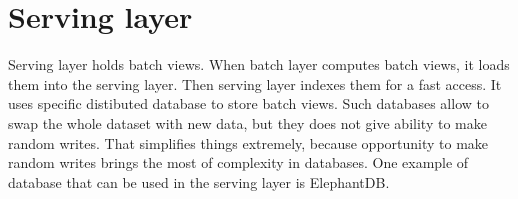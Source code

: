 \section{Serving layer}

Serving layer holds batch views.
When batch layer computes batch views, it loads them into the serving layer.
Then serving layer indexes them for a fast access.
It uses specific distibuted database to store batch views.
Such databases allow to swap the whole dataset with new data, but they does not give ability to make random writes.
That simplifies things extremely, because opportunity to make random writes brings the most of complexity in databases.
One example of database that can be used in the serving layer is ElephantDB.